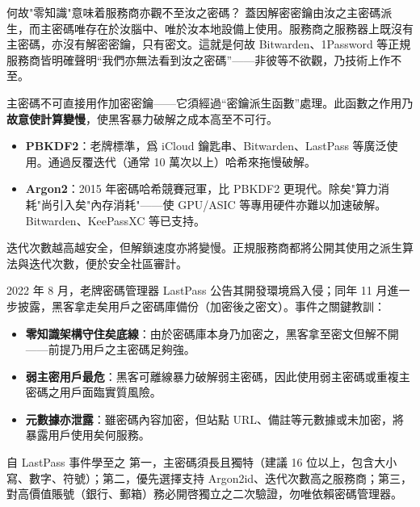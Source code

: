 \begin{tcbinfo}{何故"零知識"意味着服務商亦觀不至汝之密碼？}
蓋因解密密鑰由汝之主密碼派生，而主密碼唯存在於汝腦中、唯於汝本地設備上使用。服務商之服務器上既沒有主密碼，亦沒有解密密鑰，只有密文。這就是何故 Bitwarden、1Password 等正規服務商皆明確聲明“我們亦無法看到汝之密碼”——非彼等不欲觀，乃技術上作不至。

\end{tcbinfo}


主密碼不可直接用作加密密鑰——它須經過“密鑰派生函數”處理。此函數之作用乃\textbf{故意使計算變慢}，使黑客暴力破解之成本高至不可行。

\begin{itemize}
  \item \textbf{PBKDF2}：老牌標準，爲 iCloud 鑰匙串、Bitwarden、LastPass 等廣泛使用。通過反覆迭代（通常 10 萬次以上）哈希來拖慢破解。
  \item \textbf{Argon2}：2015 年密碼哈希競賽冠軍，比 PBKDF2 更現代。除矣"算力消耗"尚引入矣"內存消耗"——使 GPU/ASIC 等專用硬件亦難以加速破解。Bitwarden、KeePassXC 等已支持。
\end{itemize}

迭代次數越高越安全，但解鎖速度亦將變慢。正規服務商都將公開其使用之派生算法與迭代次數，便於安全社區審計。


2022 年 8 月，老牌密碼管理器 LastPass 公告其開發環境爲入侵；同年 11 月進一步披露，黑客拿走矣用戶之密碼庫備份（加密後之密文）。事件之關鍵教訓：

\begin{itemize}
  \item \textbf{零知識架構守住矣底線}：由於密碼庫本身乃加密之，黑客拿至密文但解不開——前提乃用戶之主密碼足夠強。
  \item \textbf{弱主密用戶最危}：黑客可離線暴力破解弱主密碼，因此使用弱主密碼或重複主密碼之用戶面臨實質風險。
  \item \textbf{元數據亦泄露}：雖密碼內容加密，但站點 URL、備註等元數據或未加密，將暴露用戶使用矣何服務。
\end{itemize}

\begin{tcbwarn}{自 LastPass 事件學至之}
第一，主密碼須長且獨特（建議 16 位以上，包含大小寫、數字、符號）；第二，優先選擇支持 Argon2id、迭代次數高之服務商；第三，對高價值賬號（銀行、郵箱）務必開啓獨立之二次驗證，勿唯依賴密碼管理器。

\end{tcbwarn}

